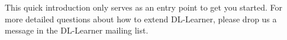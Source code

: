 \documentclass[a4paper,12pt]{scrartcl}
\begin{document}

This quick introduction only serves as an entry point to get you started. For more detailed questions about how to extend DL-Learner, please drop us a message in the DL-Learner mailing list.
\end{document}
